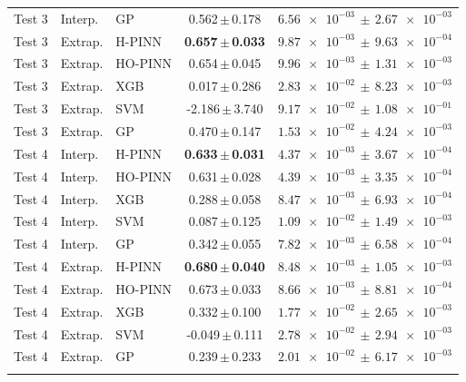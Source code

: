 \begin{longtable}{lllcc}
Test 3 & Interp. & GP & 0.562\,$\pm$\,0.178 & $\num{6.56e-03}\,\pm\,\num{2.67e-03}$ \\
\addlinespace[2pt]
Test 3 & Extrap. & H-PINN & \textbf{0.657\,$\pm$\,0.033} & \textbf{$\num{9.87e-03}\,\pm\,\num{9.63e-04}$} \\
Test 3 & Extrap. & HO-PINN & 0.654\,$\pm$\,0.045 & $\num{9.96e-03}\,\pm\,\num{1.31e-03}$ \\
Test 3 & Extrap. & XGB & 0.017\,$\pm$\,0.286 & $\num{2.83e-02}\,\pm\,\num{8.23e-03}$ \\
Test 3 & Extrap. & SVM & -2.186\,$\pm$\,3.740 & $\num{9.17e-02}\,\pm\,\num{1.08e-01}$ \\
Test 3 & Extrap. & GP & 0.470\,$\pm$\,0.147 & $\num{1.53e-02}\,\pm\,\num{4.24e-03}$ \\
\addlinespace[2pt]
Test 4 & Interp. & H-PINN & \textbf{0.633\,$\pm$\,0.031} & \textbf{$\num{4.37e-03}\,\pm\,\num{3.67e-04}$} \\
Test 4 & Interp. & HO-PINN & 0.631\,$\pm$\,0.028 & $\num{4.39e-03}\,\pm\,\num{3.35e-04}$ \\
Test 4 & Interp. & XGB & 0.288\,$\pm$\,0.058 & $\num{8.47e-03}\,\pm\,\num{6.93e-04}$ \\
Test 4 & Interp. & SVM & 0.087\,$\pm$\,0.125 & $\num{1.09e-02}\,\pm\,\num{1.49e-03}$ \\
Test 4 & Interp. & GP & 0.342\,$\pm$\,0.055 & $\num{7.82e-03}\,\pm\,\num{6.58e-04}$ \\
\addlinespace[2pt]
Test 4 & Extrap. & H-PINN & \textbf{0.680\,$\pm$\,0.040} & \textbf{$\num{8.48e-03}\,\pm\,\num{1.05e-03}$} \\
Test 4 & Extrap. & HO-PINN & 0.673\,$\pm$\,0.033 & $\num{8.66e-03}\,\pm\,\num{8.81e-04}$ \\
Test 4 & Extrap. & XGB & 0.332\,$\pm$\,0.100 & $\num{1.77e-02}\,\pm\,\num{2.65e-03}$ \\
Test 4 & Extrap. & SVM & -0.049\,$\pm$\,0.111 & $\num{2.78e-02}\,\pm\,\num{2.94e-03}$ \\
Test 4 & Extrap. & GP & 0.239\,$\pm$\,0.233 & $\num{2.01e-02}\,\pm\,\num{6.17e-03}$ \\
\addlinespace[2pt]
\end{longtable}
\endgroup
